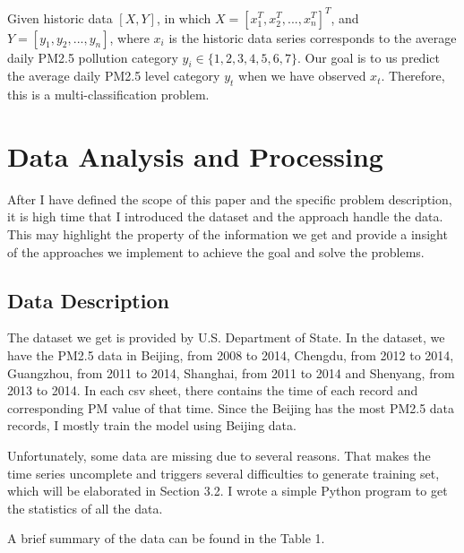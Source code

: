 \documentclass{sig-alternate}
\begin{document}
\newtheorem{theorem1}{Promblem}
\begin{theorem}
Given historic data $[X,Y]$, in which $X=[x_{1}^{T},x_{2}^{T},...,x_{n}^{T}]^{T}$, and $Y=[y_1, y_2, ..., y_n]$, where $x_i$ is the historic data series corresponds to the average daily PM2.5 pollution category $y_i \in \{1, 2, 3, 4, 5, 6, 7\}$. Our goal is to us predict the average daily PM2.5 level category $y_t$ when we have observed $x_t$. Therefore, this is a multi-classification problem.
\end{theorem}




\section{Data Analysis and Processing}
After I have defined the scope of this paper and the specific problem description, it is high time that I introduced the dataset and the approach handle the data. This may highlight the property of the information we get and provide a insight of the approaches we implement to achieve the goal and solve the problems.

\subsection{Data Description}
The dataset we get is provided by U.S. Department of State\cite{data}. In the dataset, we have the PM2.5 data in Beijing, from 2008 to 2014, Chengdu, from 2012 to 2014, Guangzhou, from 2011 to 2014, Shanghai, from 2011 to 2014 and Shenyang, from 2013 to 2014. In each csv sheet, there contains the time of each record and corresponding PM value of that time. Since the Beijing has the most PM2.5 data records, I mostly train the model using Beijing data.

Unfortunately, some data are missing due to several reasons. That makes the time series uncomplete and triggers several difficulties to generate training set, which will be elaborated in Section 3.2. I wrote a simple Python program to get the statistics of all the data.

A brief summary of the data can be found in the Table 1.
\end{document}
